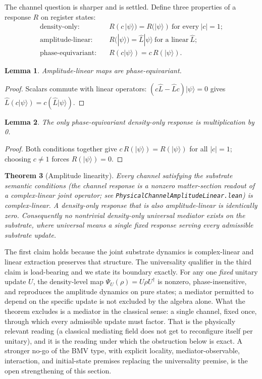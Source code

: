 \documentclass[11pt,letterpaper]{article}
\newtheorem{theorem}{Theorem}[section]
\newtheorem{lemma}[theorem]{Lemma}
\newcommand{\lean}[1]{\texttt{#1}}
\begin{document}
The channel question is sharper and is settled. Define three properties of a response $R$ on register states:
\begin{align}
\text{density-only:}\quad & R(c\,|\psi\rangle)=R(|\psi\rangle)\ \text{for every}\ |c|=1;
\label{eq:densityonly}\\
\text{amplitude-linear:}\quad & R(|\psi\rangle)=\hat{L}|\psi\rangle\ \text{for a linear}\ \hat{L};
\label{eq:amplinear}\\
\text{phase-equivariant:}\quad & R(c|\psi\rangle)=c\,R(|\psi\rangle).
\label{eq:phaseequi}
\end{align}

\begin{lemma}
Amplitude-linear maps are phase-equivariant.
\end{lemma}
\begin{proof}
Scalars commute with linear operators: $(c\hat{L}-\hat{L}c)|\psi\rangle=0$ gives $\hat{L}(c|\psi\rangle)=c(\hat{L}|\psi\rangle)$.
\end{proof}

\begin{lemma}
The only phase-equivariant density-only response is multiplication by 0.
\end{lemma}
\begin{proof}
Both conditions together give $c\,R(|\psi\rangle)=R(|\psi\rangle)$ for all $|c|=1$; choosing $c\neq 1$ forces $R(|\psi\rangle)=0$.
\end{proof}

\begin{theorem}[Amplitude linearity]
\label{thm:amplinear}
Every channel satisfying the substrate semantic conditions (the channel response is a nonzero matter-section readout of a complex-linear joint operator; see \lean{PhysicalChannelAmplitudeLinear.lean}) is complex-linear. A density-only response that is also amplitude-linear is identically zero. Consequently no nontrivial density-only \emph{universal} mediator exists on the substrate, where universal means a single fixed response serving every admissible substrate update.
\end{theorem}

The first claim holds because the joint substrate dynamics is complex-linear and linear extraction preserves that structure. The universality qualifier in the third claim is load-bearing and we state its boundary exactly. For any one \emph{fixed} unitary update $U$, the density-level map $\Psi_{U}(\rho)=U\rho U^{\dagger}$ is nonzero, phase-insensitive, and reproduces the amplitude dynamics on pure states; a mediator permitted to depend on the specific update is not excluded by the algebra alone. What the theorem excludes is a mediator in the classical sense: a single channel, fixed once, through which every admissible update must factor. That is the physically relevant reading (a classical mediating field does not get to reconfigure itself per unitary), and it is the reading under which the obstruction below is exact. A stronger no-go of the BMV type, with explicit locality, mediator-observable, interaction, and initial-state premises replacing the universality premise, is the open strengthening of this section.
\end{document}
